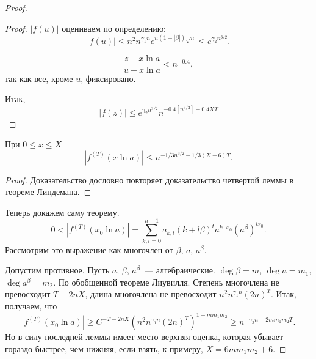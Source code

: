 \begin{proof}
\begin{proof}
    $|f(u)|$ оцениваем по определению:
    $$
      |f(u)| \leqslant n^2 n^{\gamma_1 n} e^{n(1+|\beta|)\sqrt{n}} \leqslant e^{\gamma_2 n^{3/2}}.
    $$
    
    $$
      \frac{z - x \ln a}{u - x \ln a} < n^{-0.4},
    $$
    так как все, кроме $u$, фиксировано.
    
    Итак,
    $$
      |f(z)| \leqslant e^{\gamma_2 n^{3/2}} n^{-0.4\left[n^{3/2}\right] - 0.4 XT}
    $$
  \end{proof}
  
  \begin{lemma}
    При $0 \leqslant x \leqslant X$
    $$
      |f^{(T)}(x \ln a)| \leqslant n^{-1/3 n^{3/2} - 1/3 (X - 6) T}.
    $$
  \end{lemma}
  \begin{proof}
    Доказательство дословно повторяет доказательство четвертой леммы в теореме Линдемана.
  \end{proof}
  
  Теперь докажем саму теорему.
  $$
    0 < |f^{(T)}(x_0 \ln a)| = \sum_{k,l=0}^{n-1} a_{k,l} (k + l\beta)^t a^{k \cdot x_0} \left(a^{\beta}\right)^{l x_0}.
  $$
  Рассмотрим это выражение как многочлен от $\beta$, $a$, $a^{\beta}$.
  
  Допустим противное. Пусть $a$, $\beta$, $a^{\beta}$~--- алгебраические. $\deg \beta = m$, $\deg a = m_1$, $\deg a^{\beta} = m_2$. По обобщенной теореме Лиувилля. Степень многочлена не превосходит $T + 2nX$, длина многочлена не превосходит $n^2 n^{\gamma_1 n} (2n)^T$. Итак, получаем, что
  $$
    |f^{(T)} (x_0 \ln a)| \geqslant C^{-T - 2nX} (n^2 n^{\gamma_1 n} (2n)^T)^{1 - m m_1 m_2} \geqslant n^{-\gamma_3 n - 2 m m_1 m_2 T}.
  $$
  Но в силу последней леммы имеет место верхняя оценка, которая убывает гораздо быстрее, чем нижняя, если взять, к примеру, $X = 6 m m_1 m_2 + 6$.
\end{proof}
